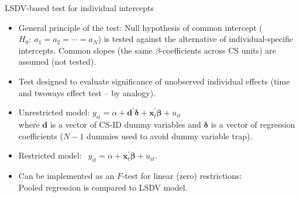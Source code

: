 \documentclass[usenames,dvipsnames]{beamer}
\begin{document}
\begin{frame}{LSDV-based test for individual intercepts}
\small
\begin{itemize}
    \item General principle of the test: Null hypothesis of common  intercept ($H_0:~a_1 = a_2 = \cdots = a_N$) is tested against the alternative of individual-specific intercepts. Common slopes (the same $\beta$-coefficients across CS units) are assumed (not tested).
    \medskip
    \item Test designed to evaluate significance of unobserved individual effects (time and twoways effect test -- by analogy).
    \medskip
    \item Unrestricted model: $y_{it} = \alpha + \bm{d}^{\prime}\bm{\delta} + \bm{x}_t^{\prime} \bm{\beta} + u_{it}$ \\ \medskip
    where $\bm{d}$ is a vector of CS-ID dummy variables and $\bm{\delta}$ is a vector of regression coefficients ($N-1$ dummies used to avoid dummy variable trap).
    \medskip
    \item Restricted model: $~~y_{it} = \alpha + \bm{x}_t^{\prime} \bm{\beta} + u_{it}$.
    \medskip
    \item Can be implemented as an $F$-test for linear (zero) restrictions: \\Pooled regression is compared to LSDV model.
\end{itemize}
\end{frame}
\end{document}
